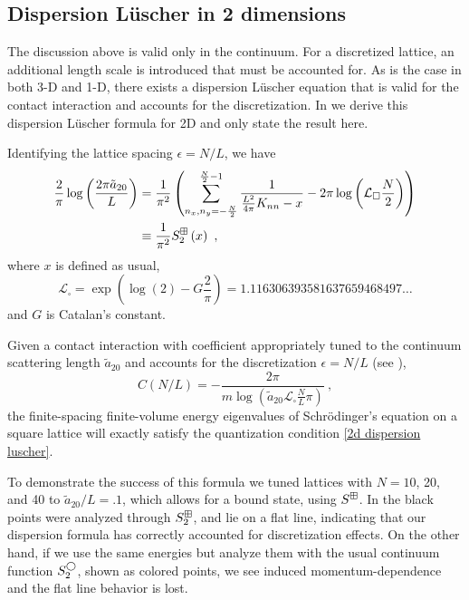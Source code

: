 \subsection{Dispersion L\"uscher in 2 dimensions}

The discussion above is valid only in the continuum.
For a discretized lattice, an additional length scale is introduced that must be accounted for.
As is the case in both 3-D and 1-D, there exists a dispersion L\"uscher equation that is valid for the contact interaction and accounts for the discretization.
In  we derive this dispersion L\"uscher formula for 2D and only state the result here.

Identifying the lattice spacing $\epsilon=N/L$, we have
\begin{align}
    \frac{2}{\pi} \log \left(\frac{2\pi \tilde a_{20}}{L}\right)
    &=
    \frac{1}{\pi^2}
    \left(
        \sum_{n_x,n_y=-\frac{N}{2}}^{\frac{N}{2}-1}\frac{1}{\frac{L^2}{4\pi}K_{nn}-x}
        -2\pi \log \left(\mathcal{L}_\square\frac{N}{2}\right)
    \right)
    \nonumber\\
    &\equiv\frac{1}{\pi^2}S^{\dispersion}_2\left(x\right)\ ,\label{eq:2d dispersion luscher}
\end{align}
where $x$ is defined as usual,
\begin{equation}
    \mathcal{L}_{\square}
    =
    \exp \left(\log (2)-G \frac{2}{\pi}\right)
    =
    1.116306393581637659468497 \ldots
\end{equation}
and $G$ is Catalan's constant.

Given a contact interaction with coefficient appropriately tuned to the continuum scattering length $\tilde a_{20}$ and accounts for the discretization $\epsilon=N/L$ (see ),
\begin{equation}
C(N/L)=-\frac{2 \pi}{m \log \left(\tilde a_{20} \mathcal{L}_\square \frac{N}{L}\pi\right)}\ ,
\end{equation}
the finite-spacing finite-volume energy eigenvalues of Schr\"odinger's equation on a square lattice will exactly satisfy the quantization condition \eqref{2d dispersion luscher}.

To demonstrate the success of this formula we tuned lattices with $N=10$, 20, and 40 to $\tilde a_{20}/L = .1$, which allows for a bound state, using $S^{\boxplus}$.
In  the black points were analyzed through $S^\boxplus_2$, and lie on a flat line, indicating that our dispersion \Luscher formula has correctly accounted for discretization effects.
On the other hand, if we use the same energies but analyze them with the usual continuum \Luscher function $S^{\bigcirc}_2$, shown as colored points, we see induced momentum-dependence and the flat line behavior is lost.

